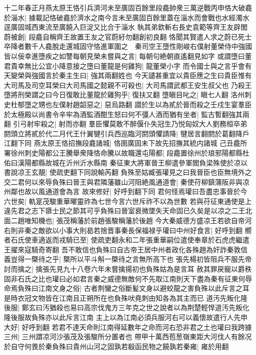 十二年春正月燕太原王恪引兵濟河未至廣固百餘里段龕帥衆三萬逆戰丙申恪大破龕於淄水|{
	據載記恪破龕於濟水之南今言未至廣固百餘里蓋在淄水而會戰也水經濁水逕廣固城西東流至廣饒入巨淀又比合于淄水}
執其弟欽斬右長史袁範等齊王友辟閭蔚被創|{
	段龕自稱齊王故置王友之官蔚紆勿翻創初良翻}
恪聞其賢遣人求之蔚已死士卒降者數千人龕脫走還城固守恪進軍圍之　秦司空王墮性剛峻右僕射董榮侍中強國皆以佞幸進墮疾之如讐每朝見榮未嘗與之言|{
	每朝句絶朝直遙翻見如字}
或謂墮曰董君貴幸無比公宜小降意接之墮曰董龍是何雞狗|{
	龍董榮小字}
而令國士與之言乎會有天變榮與強國言於秦主生曰|{
	強其兩翻姓也}
今天譴甚重宜以貴臣應之生曰貴臣惟有大司馬及司空耳榮曰大司馬國之懿親不可殺也|{
	大司馬謂武都王安生叔父也}
乃殺王墮將刑榮謂之曰今日復敢比董龍於雞狗乎|{
	復扶又翻}
墮瞋目叱之|{
	瞋七人翻}
洛州刺史杜郁墮之甥也左僕射趙韶惡之|{
	惡烏路翻}
譛於生以為貳於晉而殺之壬戍生宴羣臣於太極殿以尚書令辛牢為酒監酒酣生怒曰何不彊人酒而猶有坐者|{
	監古暫翻強其兩翻}
引弓射牢殺之|{
	射而亦翻}
羣臣懼莫敢不醉偃仆失冠生乃悦匈奴大人劉務桓卒弟閼頭立將貳於代二月代王什翼犍引兵西巡臨河閼頭懼請降|{
	犍居言翻閼於葛翻降戶江翻下同}
燕太原王恪招撫段龕諸城|{
	恪圉廣固未下故先招撫其統内諸城}
己丑龕所署徐州刺史陽都公王騰舉衆降恪命騰以故職還屯陽都|{
	段龕置徐州於琅邪陽都縣杜佑曰漢陽都縣故城在沂州沂水縣南}
秦征東大將軍晉王柳遣參軍閻負梁殊使於凉以書說凉王玄靚|{
	使疏吏翻下同說輸芮翻}
負殊至姑臧張瓘見之曰我晉臣也臣無境外之交二君何以來辱負殊曰晉王與君隣藩雖山河阻絶風通道會|{
	秦使苻柳鎮蒲阪非與凉州鄰也故以風通道會為言}
故來修好|{
	好呼到翻下同}
君何怪焉瓘曰吾盡忠事晉於今六世矣|{
	軌寔茂駿重華曜靈祚為七世今言六世斥祚不以為世數}
若與苻征東通使是上違先君之志下隳士民之節其可乎負殊曰晉室衰微墜失天命固已久矣是以凉之二王北面二趙唯知機也|{
	張茂稱藩於前趙張駿稱藩於後趙}
今大秦威德方盛凉王若欲自帝河右則非秦之敵欲以小事大則曷若捨晋事秦長保福禄乎瓘曰中州好食言|{
	好呼到翻}
嚮者石氏使車適返而戎騎已至|{
	使疏吏翻永和二年張重華嗣位遣使奉章於石虎虎繼遣王擢來寇騎奇寄翻}
吾不敢信也負殊曰自古帝王居中州者政化各殊趙為奸詐秦敦信義豈得一槩待之乎|{
	槩所以平斗斛一槩待之言無所高下也}
張先楊初皆阻兵不服先帝討而擒之|{
	擒張先見九十八卷六年未嘗擒揚初也負殊姑為是言耳}
赦其罪戻寵以爵秩固非石氏之比也瓘曰必如君言秦之威德無敵何不先取江南則天下盡為秦有征東何辱命焉負殊曰江南文身之俗|{
	古者荆蠻之俗斷髪文身以避蛟龍之害負殊以此斥言之耳是時衣冠文物皆在江南且正朔所在也負殊吠堯刺由知各為其主而已}
道汚先叛化隆後服|{
	鄭玄曰汚猶殺也易曰高宗伐鬼方三年克之世之說者以為荆楚輕悍道汚先叛化隆後服故負殊亦以此斥言江南}
主上以為江南必須兵服河右可以義懷故遣行人先申大好|{
	好呼到翻}
若君不達天命則江南得延數年之命而河右恐非君之土也瓘曰我跨據三州|{
	三州謂凉河沙張茂及張駿所分置者也}
帶甲十萬西苞葱嶺東距大河伐人有餘况於自守何畏於秦負殊曰貴州山河之固孰若殽函民物之饒孰若秦雍|{
	雍於用翻}
